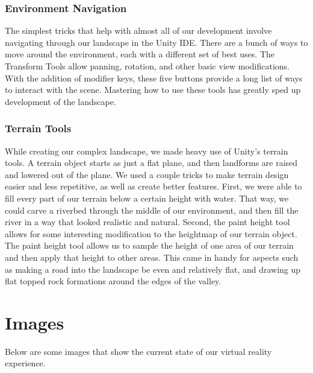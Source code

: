 \documentclass[10pt,journal,compsoc,onecolumn, draftclsnofoot]{IEEEtran}
\begin{document}
\subsubsection{Environment Navigation}
The simplest tricks that help with almost all of our development involve navigating through our landscape in the Unity IDE.
There are a bunch of ways to move around the environment, each with a different set of best uses.
The Transform Tools allow panning, rotation, and other basic view modifications.
With the addition of modifier keys, these five buttons provide a long list of ways to interact with the scene.
Mastering how to use these tools has greatly sped up development of the landscape.

\subsubsection{Terrain Tools}
While creating our complex landscape, we made heavy use of Unity's terrain tools.
A terrain object starts as just a flat plane, and then landforms are raised and lowered out of the plane.
We used a couple tricks to make terrain design easier and less repetitive, as well as create better features.
First, we were able to fill every part of our terrain below a certain height with water.
That way, we could carve a riverbed through the middle of our environment, and then fill the river in a way that looked realistic and natural.
Second, the paint height tool allows for some interesting modification to the heightmap of our terrain object.
The paint height tool allows us to sample the height of one area of our terrain and then apply that height to other areas.
This came in handy for aspects such as making a road into the landscape be even and relatively flat, and drawing up flat topped rock formations around the edges of the valley.

\section{Images}
Below are some images that show the current state of our virtual reality experience.
\end{document}
